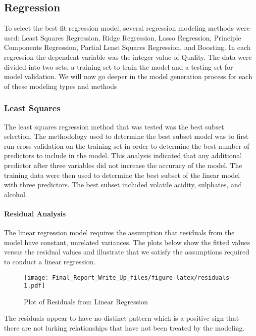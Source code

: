 \documentclass[]{article}
\let\oldparagraph\paragraph
\renewcommand{\paragraph}[1]{\oldparagraph{#1}\mbox{}}
\begin{document}
\subsection{Regression}\label{regression}

To select the best fit regression model, several regression modeling
methods were used: Least Squares Regression, Ridge Regression, Lasso
Regression, Principle Components Regression, Partial Least Squares
Regression, and Boosting. In each regression the dependent variable was
the integer value of Quality. The data were divided into two sets, a
training set to train the model and a testing set for model validation.
We will now go deeper in the model generation process for each of these
modeling types and methods

\subsubsection{Least Squares}\label{least-squares}

The least squares regression method that was tested was the best subset
selection. The methodology used to determine the best subset model was
to first run cross-validation on the training set in order to determine
the best number of predictors to include in the model. This analysis
indicated that any additional predictor after three variables did not
increase the accuracy of the model. The training data were then used to
determine the best subset of the linear model with three predictors. The
best subset included volatile acidity, sulphates, and alcohol.

\paragraph{Residual Analysis}\label{residual-analysis}

The linear regression model requires the assumption that residuals from
the model have constant, unrelated variances. The plots below show the
fitted values versus the residual values and illustrate that we satisfy
the assumptions required to conduct a linear regression.

\begin{figure}[htbp]
\centering
\texttt{[image: Final\_Report\_Write\_Up\_files/figure-latex/residuals-1.pdf]}
\caption{Plot of Residuals from Linear Regression}
\end{figure}

The residuals appear to have no distinct pattern which is a positive
sign that there are not lurking relationships that have not been treated
by the modeling.
\end{document}
